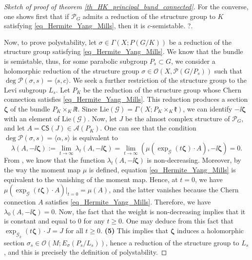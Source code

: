 {\begin{proof}[\textit{Sketch of proof of theorem} \ref{th_HK_principal_bund_connected}]
    For the converse, one shows first that if \(\mathcal{P}_G\) admits a reduction of the structure group to \(K\) satisfying \eqref{eq_Hermite_Yang_Mills}, then it is \(c\)-semistable. {\color{red}?}.
        
    Now, to prove polystability, let \(\sigma \in \Gamma(X; P(G/K))\) be a reduction of the structure group satisfying \eqref{eq_Hermite_Yang_Mills}. We know that the bundle is semistable, thus, for some parabolic subgroup \(P_s \subset G\), we consider a holomorphic reduction of the structure group \(\sigma \in \mathcal{O}(X, \mathcal{P}(G/P_s))\) such that \(\deg \mathcal{P}(\sigma, s)=\langle s, c \rangle\). We seek a further restriction of the structure group to the Levi subgroup \(L_s\). Let \(P_K\) be the reduction of the structure group whose Chern connection satisfies \eqref{eq_Hermite_Yang_Mills}. This reduction produces a section \(\bm{\zeta}\) of the bundle \(P_K \times_K \ii \mathfrak{k}\). Since \(\mathrm{Lie}(\mathscr{G})=\Gamma(X;P_K \times_K \mathfrak{k})\), we can identify \(-\ii \bm{\zeta}\) with an element of \(\mathrm{Lie}(\mathscr{G})\). Now, let \(J\) be the almost complex structure of \(\mathcal{P}_G\), and let \(A=\mathsf{CS}(J)\in \mathscr{A}(P_K)\). One can see that the condition \(\deg \mathcal{P}(\sigma, s)=\langle \alpha, s\rangle\) is equivalent to 
    \[
    \lambda(A, -\ii \bm{\zeta}):=\lim_{t \to \infty} \lambda_t(A, -\ii \bm{\zeta})=\lim_{t\to \infty} ( \mu(\exp_{\mathscr{G}}(t \bm{\zeta})\cdot A), -\ii \bm{\zeta}) =0.
    \]
    From \parencite[Lemma 2.2]{i1999hitchin}, we know that the function \(\lambda_t(A, -\ii \bm{\zeta})\) is non-decreasing. Moreover, by the way the moment map \(\mu\) is defined, equation \eqref{eq_Hermite_Yang_Mills} is equivalent to the vanishing of the moment map. Hence, at \(t=0\), we have \(\mu(\exp_{\mathscr{G}}(t \bm{\zeta})\cdot A)|_{t=0}=\mu(A)\), and the latter vanishes because the Chern connection \(A\) satisfies \eqref{eq_Hermite_Yang_Mills}. Therefore, we have \(\lambda_0(A, -\ii \bm{\zeta})=0\). Now, the fact that the weight is non-decreasing implies that it is constant and equal to \(0\) for any \(t \geq 0\). One may deduce from this fact that \(\exp_{\mathscr{G}_k}(t \bm{\zeta})\cdot J=J\) for all \(t \geq 0\). \textbf{(5)} This implies that \(\bm{\zeta}\) induces a holomorphic section \(\sigma_s \in \mathcal{O}(M; E_\sigma(P_s/L_s))\), hence a reduction of the structure group to \(L_s\), and this is precisely the definition of polystability.
\end{proof}
}

